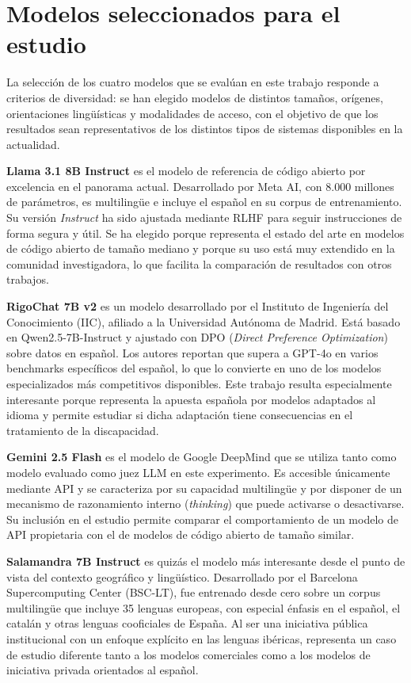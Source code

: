 \documentclass[12pt]{report} %
\renewcommand{\_}{\oldunderscore\allowbreak}
\begin{document}
\section{Modelos seleccionados para el estudio}
La selección de los cuatro modelos que se evalúan en este trabajo responde a criterios de diversidad: se han elegido modelos de distintos tamaños, orígenes, orientaciones lingüísticas y modalidades de acceso, con el objetivo de que los resultados sean representativos de los distintos tipos de sistemas disponibles en la actualidad.

\textbf{Llama 3.1 8B Instruct} \cite{llama3} es el modelo de referencia de código abierto por excelencia en el panorama actual. Desarrollado por Meta AI, con 8.000 millones de parámetros, es multilingüe e incluye el español en su corpus de entrenamiento. Su versión \textit{Instruct} ha sido ajustada mediante RLHF para seguir instrucciones de forma segura y útil. Se ha elegido porque representa el estado del arte en modelos de código abierto de tamaño mediano y porque su uso está muy extendido en la comunidad investigadora, lo que facilita la comparación de resultados con otros trabajos.

\textbf{RigoChat 7B v2} \cite{rigochat} es un modelo desarrollado por el Instituto de Ingeniería del Conocimiento (IIC), afiliado a la Universidad Autónoma de Madrid. Está basado en Qwen2.5-7B-Instruct y ajustado con DPO (\textit{Direct Preference Optimization}) sobre datos en español. Los autores reportan que supera a GPT-4o en varios benchmarks específicos del español, lo que lo convierte en uno de los modelos especializados más competitivos disponibles. Este trabajo resulta especialmente interesante porque representa la apuesta española por modelos adaptados al idioma y permite estudiar si dicha adaptación tiene consecuencias en el tratamiento de la discapacidad.

\textbf{Gemini 2.5 Flash} \cite{gemini2025} es el modelo de Google DeepMind que se utiliza tanto como modelo evaluado como juez LLM en este experimento. Es accesible únicamente mediante API y se caracteriza por su capacidad multilingüe y por disponer de un mecanismo de razonamiento interno (\textit{thinking}) que puede activarse o desactivarse. Su inclusión en el estudio permite comparar el comportamiento de un modelo de API propietaria con el de modelos de código abierto de tamaño similar.

\textbf{Salamandra 7B Instruct} \cite{salamandra} es quizás el modelo más interesante desde el punto de vista del contexto geográfico y lingüístico. Desarrollado por el Barcelona Supercomputing Center (BSC-LT), fue entrenado desde cero sobre un corpus multilingüe que incluye 35 lenguas europeas, con especial énfasis en el español, el catalán y otras lenguas cooficiales de España. Al ser una iniciativa pública institucional con un enfoque explícito en las lenguas ibéricas, representa un caso de estudio diferente tanto a los modelos comerciales como a los modelos de iniciativa privada orientados al español.
\end{document}
